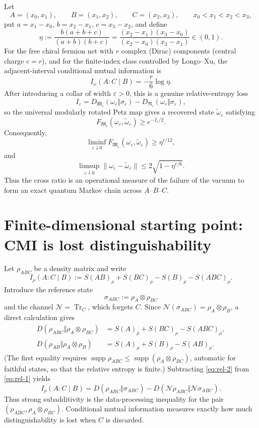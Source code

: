 \documentclass[11pt]{article}
\theoremstyle{accenttheorem}
\theoremstyle{definition}
\newcommand{\cM}{\mathfrak{M}}
\newcommand{\cN}{\mathfrak{N}}
\newcommand{\Tr}{\operatorname{Tr}}
\newcommand{\CMI}{I}
\newcommand{\eps}{\varepsilon}
\newcommand{\1}{\mathbf{1}}
\begin{document}
\begin{mainresult}
Let
\[
 A=(x_0,x_1),\qquad B=(x_1,x_2),\qquad C=(x_2,x_3),
 \qquad x_0<x_1<x_2<x_3,
\]
put \(a=x_1-x_0\), \(b=x_2-x_1\), \(c=x_3-x_2\), and define
\[
 \eta:=\frac{b(a+b+c)}{(a+b)(b+c)}
 =\frac{(x_2-x_1)(x_3-x_0)}{(x_2-x_0)(x_3-x_1)}\in(0,1).
\]
For the free chiral fermion net with \(r\) complex (Dirac) components (central charge \(c=r\)), and for the finite-index class controlled by Longo--Xu, the adjacent-interval conditional mutual information is
\[
 \CMI_\omega(A:C\mid B)=-\frac r6\log\eta.
\]
After introducing a collar of width \(\eps>0\), this is a genuine relative-entropy loss
\[
 \CMI_\eps
 =D_{\cM_\eps}(\omega_\eps\Vert\sigma_\eps)
  -D_{\cN_\eps}(\omega_\eps\Vert\sigma_\eps),
\]
so the universal modularly rotated Petz map gives a recovered state
\(\widetilde\omega_\eps\) satisfying
\[
 F_{\cM_\eps}(\omega_\eps,\widetilde\omega_\eps)
 \ge e^{-\CMI_\eps/2}.
\]
Consequently,
\[
 \boxed{\quad
 \liminf_{\eps\downarrow0}
 F_{\cM_\eps}(\omega_\eps,\widetilde\omega_\eps)
 \ge \eta^{r/12},
 \quad}
\]
and
\[
 \boxed{\quad
 \limsup_{\eps\downarrow0}
 \|\omega_\eps-\widetilde\omega_\eps\|
 \le 2\sqrt{1-\eta^{r/6}}.
 \quad}
\]
Thus the cross ratio is an operational measure of the failure of the vacuum to form an exact quantum Markov chain across \(A\)--\(B\)--\(C\).
\end{mainresult}

\section{Finite-dimensional starting point: CMI is lost distinguishability}

Let \(\rho_{ABC}\) be a density matrix and write
\[
 \CMI_\rho(A:C\mid B)
 :=S(AB)_\rho+S(BC)_\rho-S(B)_\rho-S(ABC)_\rho.
\]
Introduce the reference state
\[
 \sigma_{ABC}:=\rho_A\otimes\rho_{BC}
\]
and the channel \(\mathcal N=\Tr_C\), which forgets \(C\).  Since
\(\mathcal N(\sigma_{ABC})=\rho_A\otimes\rho_B\), a direct calculation gives
\begin{align}
 D(\rho_{ABC}\Vert\rho_A\otimes\rho_{BC})
 &=S(A)_\rho+S(BC)_\rho-S(ABC)_\rho,\label{eq:rel-1}\\
 D(\rho_{AB}\Vert\rho_A\otimes\rho_B)
 &=S(A)_\rho+S(B)_\rho-S(AB)_\rho.\label{eq:rel-2}
\end{align}
(The first equality requires \(\operatorname{supp}\rho_{ABC}\le\operatorname{supp}(\rho_A\otimes\rho_{BC})\), automatic for faithful states, so that the relative entropy is finite.)
Subtracting \eqref{eq:rel-2} from \eqref{eq:rel-1} yields
\begin{equation}\label{eq:cmi-dpi-defect}
 \boxed{
 \CMI_\rho(A:C\mid B)
 =D(\rho_{ABC}\Vert\sigma_{ABC})
  -D(\mathcal N\rho_{ABC}\Vert\mathcal N\sigma_{ABC}).
 }
\end{equation}
Thus strong subadditivity is the data-processing inequality for the pair
\((\rho_{ABC},\rho_A\otimes\rho_{BC})\).  Conditional mutual information measures exactly how much distinguishability is lost when \(C\) is discarded.
\end{document}
